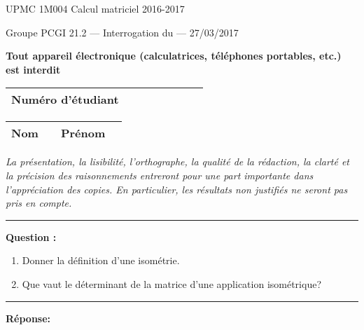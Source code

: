 \documentclass[11pt]{article}
\begin{document}
{\large UPMC \hfill 1M004 Calcul matriciel \hfill 2016-2017}

\vskip -3mm
\noindent \textbf{\hrulefill}

\vskip 1mm

\centerline{
{\large Groupe PCGI 21.2 \hspace{1.7 cm} --- Interrogation du --- \hspace{3.5 cm}  27/03/2017}}


\vskip -2mm
\noindent \textbf{\hrulefill}



\vskip 2mm

\centerline{\textbf{Tout appareil \'electronique (calculatrices, t\'el\'ephones portables, etc.) est interdit}}

\vskip 2mm
{\LARGE
\begin{center}
\begin{tabular}{|p{7cm}|p{1cm}|p{1cm}|p{1cm}|p{1cm}|p{1cm}|p{1cm}|p{1cm}|}
\hline
\textbf{Num\'ero d'\'etudiant} &     & & & & &   &
\\
\hline
\end{tabular}

\vskip 0.25cm

\begin{tabular}{|p{2cm}|p{6cm}|p{3cm}|p{5cm}|}
\hline
\textbf{Nom} &     & \textbf{Pr\'enom   }  &   \\
\hline
\end{tabular}
\end{center}
} %


{\sl  La pr\'esentation, la lisibilit\'e, l'orthographe, la
 qualit\'e de la r\'edaction, la clart\'e et la pr\'ecision des
 raisonnements entreront pour une part importante dans
 l'appr\'eciation des copies. En particulier, les r\'esultats non
 justifi\'es ne seront pas pris en compte. }


\vskip 3mm
\hrule

\vskip 3mm
\noindent \textbf{Question :}\\
\begin{enumerate}
\item Donner la définition d'une isométrie.
\item Que vaut le déterminant de la matrice d'une application isométrique?
\end{enumerate}

\kern\medskipamount

\hrule

\vskip 3mm


\noindent \textbf{Réponse:}\\

\newpage
\end{document}
